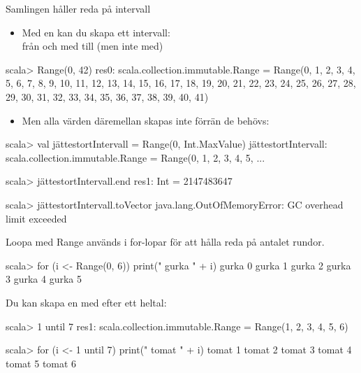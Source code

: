 \begin{Slide}{Samlingen  håller reda på intervall}
\begin{itemize}
\item Med en  kan du skapa ett intervall: \\ från och med  till (men inte med) 
\end{itemize}

\begin{REPLnonum}
scala> Range(0, 42)
res0: scala.collection.immutable.Range =
  Range(0, 1, 2, 3, 4, 5, 6, 7, 8, 9, 10, 11, 12, 13, 14,
    15, 16, 17, 18, 19, 20, 21, 22, 23, 24, 25, 26, 27, 28,
    29, 30, 31, 32, 33, 34, 35, 36, 37, 38, 39, 40, 41)
\end{REPLnonum}

\begin{itemize}
\item Men alla värden däremellan skapas inte förrän de behövs:
\end{itemize}

\begin{REPL}
scala> val jättestortIntervall = Range(0, Int.MaxValue)
jättestortIntervall: scala.collection.immutable.Range = Range(0, 1, 2, 3, 4, 5, ...

scala> jättestortIntervall.end
res1: Int = 2147483647

scala> jättestortIntervall.toVector
java.lang.OutOfMemoryError: GC overhead limit exceeded
\end{REPL}

\end{Slide}

\begin{Slide}{Loopa med Range}
 används i for-lopar för att hålla reda på antalet rundor.
\begin{REPLnonum}
scala> for (i <- Range(0, 6)) print(" gurka " + i)
 gurka 0 gurka 1 gurka 2 gurka 3 gurka 4 gurka 5
\end{REPLnonum}
Du kan skapa en  med  efter ett heltal:
\begin{REPLnonum}
scala> 1 until 7
res1: scala.collection.immutable.Range =
  Range(1, 2, 3, 4, 5, 6)

scala> for (i <- 1 until 7) print(" tomat " + i)
 tomat 1 tomat 2 tomat 3 tomat 4 tomat 5 tomat 6

\end{REPLnonum}
\end{Slide}

